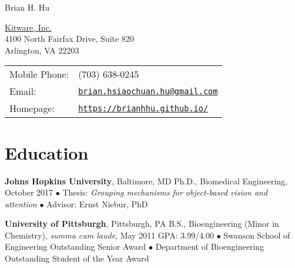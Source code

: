 \documentclass[10pt,letterpaper]{article}
\def\name{Brian H. Hu}
\renewenvironment{itemize}{
  \begin{list}{}{
    \setlength{\leftmargin}{1.5em}
    \setlength{\itemsep}{0.25em}
    \setlength{\parskip}{0pt}
    \setlength{\parsep}{0.25em}
  }
}{
  \end{list}
}
\begin{document}
{\huge \name}


\vspace{0.25in}

\begin{minipage}{0.475\linewidth}
  \href{https://www.kitware.com/about/}{Kitware, Inc.} \\
  4100 North Fairfax Drive, Suite 820 \\
  Arlington, VA 22203
\end{minipage}
\begin{minipage}{0.52\linewidth}
  \begin{tabular}{ll}
    Mobile Phone: & (703) 638-0245 \\
    Email: & \href{mailto:brian.hsiaochuan.hu@gmail.com}{\tt brian.hsiaochuan.hu@gmail.com} \\
    Homepage: & \href{https://brianhhu.github.io/}{\tt https://brianhhu.github.io/} \\
  \end{tabular}
\end{minipage}

\section*{Education}
\vspace{-0.05in}
\begin{itemize}
  \item \textbf{Johns Hopkins University}, Baltimore, MD
  \subitem Ph.D., Biomedical Engineering, October 2017
  \subitem$\bullet$ Thesis: \textit{Grouping mechanisms for object-based vision and attention}
  \subitem$\bullet$ Advisor: Ernst Niebur, PhD
  
  \item \textbf{University of Pittsburgh}, Pittsburgh, PA
  \subitem B.S., Bioengineering (Minor in Chemistry), \textit{summa cum laude}, May 2011
  \subitem GPA: 3.99/4.00
  \vspace{0.05in}
  \subitem$\bullet$ Swanson School of Engineering Outstanding Senior Award
  \subitem$\bullet$ Department of Bioengineering Outstanding Student of the Year Award
\end{itemize}

\vspace{-0.25in}
\end{document}
